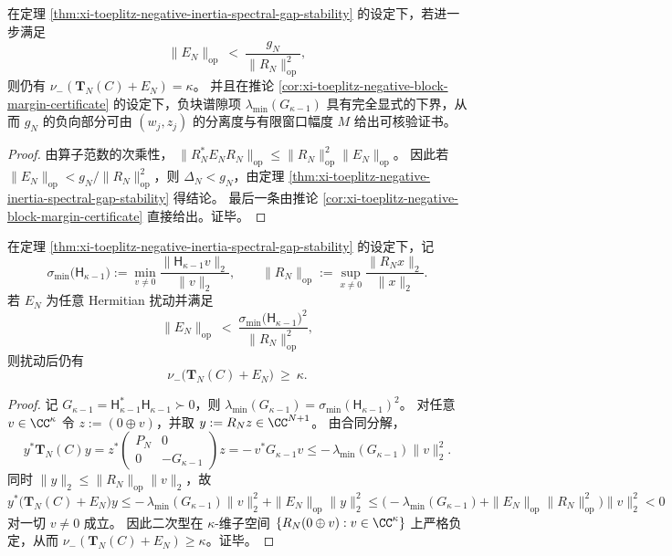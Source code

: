 \begin{corollary}[合同尺度下的可允许扰动半径]\label{cor:xi-toeplitz-negative-inertia-allowed-perturb-radius}
在定理 \ref{thm:xi-toeplitz-negative-inertia-spectral-gap-stability} 的设定下，若进一步满足
\[
\|E_N\|_{\mathrm{op}}\ <\ \frac{g_N}{\|R_N\|_{\mathrm{op}}^{2}},
\]
则仍有 \(\nu_-(\mathbf{T}_N(C)+E_N)=\kappa\)。
并且在推论 \ref{cor:xi-toeplitz-negative-block-margin-certificate} 的设定下，负块谱隙项 \(\lambda_{\min}(G_{\kappa-1})\) 具有完全显式的下界，从而 \(g_N\) 的负向部分可由 \((w_j,z_j)\) 的分离度与有限窗口幅度 \(M\) 给出可核验证书。
\end{corollary}
\begin{proof}
由算子范数的次乘性，
\(
\|R_N^{\ast}E_N R_N\|_{\mathrm{op}}\le \|R_N\|_{\mathrm{op}}^2\|E_N\|_{\mathrm{op}}
\)。
因此若 \(\|E_N\|_{\mathrm{op}}<g_N/\|R_N\|_{\mathrm{op}}^2\)，则 \(\Delta_N<g_N\)，由定理 \ref{thm:xi-toeplitz-negative-inertia-spectral-gap-stability} 得结论。
最后一条由推论 \ref{cor:xi-toeplitz-negative-block-margin-certificate} 直接给出。证毕。
\end{proof}

\begin{corollary}\label{cor:xi-toeplitz-negative-subspace-preservation-threshold}
在定理 \ref{thm:xi-toeplitz-negative-inertia-spectral-gap-stability} 的设定下，记
\[
\sigma_{\min}\!\bigl(\mathsf H_{\kappa-1}\bigr):=\min_{v\neq 0}\frac{\|\mathsf H_{\kappa-1}v\|_2}{\|v\|_2},
\qquad
\|R_N\|_{\mathrm{op}}:=\sup_{x\neq 0}\frac{\|R_Nx\|_2}{\|x\|_2}.
\]
若 \(E_N\) 为任意 Hermitian 扰动并满足
\[
\|E_N\|_{\mathrm{op}}\ <\ \frac{\sigma_{\min}\!\bigl(\mathsf H_{\kappa-1}\bigr)^2}{\|R_N\|_{\mathrm{op}}^{2}},
\]
则扰动后仍有
\[
\nu_-\!\bigl(\mathbf{T}_N(C)+E_N\bigr)\ \ge\ \kappa.
\]
\end{corollary}
\begin{proof}
记 \(G_{\kappa-1}=\mathsf H_{\kappa-1}^{\ast}\mathsf H_{\kappa-1}\succ 0\)，则 \(\lambda_{\min}(G_{\kappa-1})=\sigma_{\min}(\mathsf H_{\kappa-1})^2\)。
对任意 \(v\in\CC^{\kappa}\) 令 \(z:=(0\oplus v)\)，并取
\(
y:=R_N z\in\CC^{N+1}
\)。
由合同分解，
\[
y^{\ast}\mathbf{T}_N(C)y
=z^{\ast}\begin{pmatrix}P_N&0\\0&-G_{\kappa-1}\end{pmatrix}z
=-\,v^{\ast}G_{\kappa-1}v
\le -\,\lambda_{\min}(G_{\kappa-1})\|v\|_2^2.
\]
同时 \(\|y\|_2\le \|R_N\|_{\mathrm{op}}\|v\|_2\)，故
\[
y^{\ast}\bigl(\mathbf{T}_N(C)+E_N\bigr)y
\le -\,\lambda_{\min}(G_{\kappa-1})\|v\|_2^2+\|E_N\|_{\mathrm{op}}\|y\|_2^2
\le \bigl(-\lambda_{\min}(G_{\kappa-1})+\|E_N\|_{\mathrm{op}}\|R_N\|_{\mathrm{op}}^2\bigr)\|v\|_2^2<0
\]
对一切 \(v\neq 0\) 成立。
因此二次型在 \(\kappa\)-维子空间 \(\{R_N(0\oplus v):v\in\CC^\kappa\}\) 上严格负定，从而 \(\nu_-(\mathbf{T}_N(C)+E_N)\ge \kappa\)。证毕。
\end{proof}

